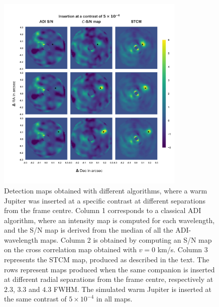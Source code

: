 \documentclass{aa}
\begin{document}
\begin{figure}%
    \centering
    \includegraphics[width=0.8\textwidth]{Fig1_Dec_highres_noinbetween.png}
    \caption{Detection maps obtained with different algorithms, where a warm Jupiter was inserted at a specific contrast at different separations from the frame centre. Column 1 corresponds to a classical ADI algorithm, where an intensity map is computed for each wavelength, and the S/N map is derived from the median of all the ADI-wavelength maps. Column 2 is obtained by computing an S/N map on the cross correlation map obtained with $v=0$ km/s. Column 3 represents the STCM map, produced as described in the text. The rows represent maps produced when the same companion is inserted at different radial separations from the frame centre, respectively at $2.3$, $3.3$ and $4.3$ FWHM. %
    The simulated warm Jupiter is inserted at the same contrast of $5\times10^{-4}$ in all maps.}
    \label{fig:fig_1}
\end{figure}
\end{document}

